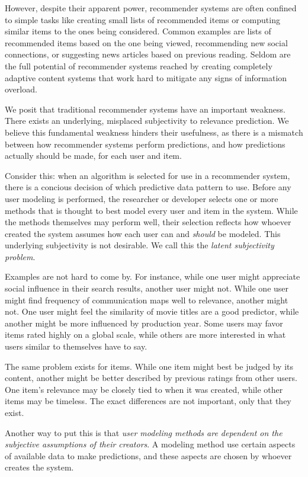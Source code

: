 However, despite their apparent power, recommender systems are often confined
to simple tasks like creating small lists of recommended items
or computing similar items to the ones being considered.
Common examples are lists of recommended items based on the one being viewed, 
recommending new social connections, or suggesting news articles based on previous reading.
Seldom are the full potential of recommender systems reached by creating completely adaptive
content systems that work hard to mitigate any signs of information overload.

We posit that traditional recommender systems have an important weakness.
There exists an underlying, misplaced subjectivity to relevance prediction.
We believe this fundamental weakness hinders their usefulness,
as there is a mismatch between how recommender systems perform predictions,
and how predictions actually should be made, for each user and item.



Consider this: 
when an algorithm is selected for use in a recommender system,
there is a concious decision of which predictive data pattern to use.
Before any user modeling is performed, the researcher or developer selects
one or more methods that is thought to best model every user and item in the system.
While the methods themselves may perform well, their selection
reflects how whoever created the system assumes how each user
can and \emph{should} be modeled. This underlying subjectivity is not desirable.
We call this the \emph{latent subjectivity problem}.

Examples are not hard to come by.
For instance, while one user might appreciate social
influence in their search results, another user might not.
While one user might find frequency of communication maps well to relevance,
another might not. 
One user might feel the similarity of movie titles are a good predictor,
while another might be more influenced by production year.
Some users may favor items rated highly on a global scale,
while others are more interested in what users similar to themselves have to say.

The same problem exists for items. While one item might best be judged by its content,
another might be better described by previous ratings from other users.
One item's relevance may be closely tied to when it was created,
while other items may be timeless.
The exact differences are not important, only that they exist.

Another way to put this is that 
\emph{user modeling methods are dependent on the subjective assumptions of their creators}.
A modeling method use certain aspects of available data to make predictions,
and these aspects are chosen by whoever creates the system.

